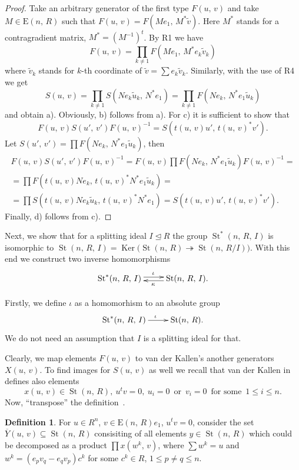 \documentclass[11pt]{amsart}
\theoremstyle{plain} \declaretheorem[name=Theorem, Refname={Theorem,Theorems}]{tm} \Crefname{tm}{Theorem}{Theorems}
\numberwithin{equation}{section}
\theoremstyle{definition} \newtheorem{df}[lm]{Definition} \Crefname{df}{Definition}{Definitions}
\theoremstyle{remark} \newtheorem{rk}[lm]{Remark} \Crefname{rk}{Remark}{Remarks}
\newcommand{\Ker}{\mathop{\mathrm{Ker}}\nolimits}
\newcommand{\E}{{\mathrm{E}}}
\newcommand{\St}{\mathop{\mathrm{St}}\nolimits}
\newcommand{\epi}{\twoheadrightarrow}
\newcommand{\inv}{^{-1}}
\begin{document}
\begin{proof}
Take an arbitrary generator of the first type $F(u,\,v)$ and take $M\in\E(n,\,R)$ such that $F(u,\,v)=F(Me_1,\,M^*\tilde v)$. Here $M^*$ stands for a contragradient matrix, $M^*=(M\inv)^t$. By R1 we have
$$
F(u,\,v)=\prod\limits_{k\neq1}F(Me_1,\,M^*e_k\tilde v_k)
$$
where $\tilde v_k$ stands for $k$-th coordinate of $\tilde v=\sum e_k\tilde v_k$. Similarly, with the use of R4 we get 
$$
S(u,\,v)=\prod\limits_{k\neq1}S(Ne_k\tilde u_k,\,N^*e_1)=\prod\limits_{k\neq1}F(Ne_k,\,N^*e_1\tilde u_k)
$$
and obtain a). Obviously, b) follows from a). For c) it is sufficient to show that
$$
F(u,\,v)S(u',\,v')F(u,\,v)\inv=S(t(u,\,v)u',\,t(u,\,v)^*v').
$$
Let $S(u',\,v')=\prod F(Ne_k,\,N^*e_1\tilde u_k)$, then
\begin{multline*}
F(u,\,v)S(u',\,v')F(u,\,v)\inv=F(u,\,v)\prod F(Ne_k,\,N^*e_1\tilde u_k)F(u,\,v)\inv=\\
=\prod F(t(u,\,v)Ne_k,\,t(u,\,v)^*N^*e_1\tilde u_k)=\\
=\prod S(t(u,\,v)Ne_k\tilde u_k,\,t(u,\,v)^*N^*e_1)=S(t(u,\,v)u',\,t(u,\,v)^*v').
\end{multline*}
Finally, d) follows from c).
\end{proof}

Next, we show that for a splitting ideal $I\trianglelefteq R$ the group $\St^*(n,\,R,\,I)$ is isomorphic to $\St(n,\,R,\,I)=\Ker\big(\St(n,\,R)\epi\St(n,\,R/I)\big)$. With this end we construct two inverse homomorphisms
$$
\xymatrix{
\St^*(n,\,R,\,I)\ar@<0.5ex>[r]^{\iota}&\St(n,\,R,\,I)\ar@<0.5ex>[l]^{\kappa}.
}
$$

Firstly, we define $\iota$ as a homomorhism to an absolute group
$$
\xymatrix{
\St^*(n,\,R,\,I)\ar@<0.0ex>[r]^{\iota}&\St(n,\,R).
}
$$
We do not need an assumption that $I$ is a splitting ideal for that.

Clearly, we map elements $F(u,\,v)$ to van der Kallen's another generators $X(u,\,v)$. To find images for $S(u,\,v)$ as well we recall that van der Kallen in~\cite[3.8--3.10]{vdK} defines also elements
$$
x(u,\,v)\in\St(n,\,R),\ u^tv=0,\ u_i=0\,\text{ or }\,v_i=0\,\text{ for some }\,1\leq i\leq n.
$$
Now, ``transpose'' the definition~\cite[3.13]{vdK}.

\begin{df}
For $u\in R^n$, $v\in\E(n,\,R)e_1$, $u^tv=0$, consider the set $\overline Y(u,\,v)\subseteq\St(n,\,R)$ consisiting of all elements $y\in\St(n,\,R)$ which could be decomposed as a product $\prod x(w^k,\,v)$, where $\sum w^k=u$ and $w^k=(e_pv_q-e_qv_p)c^k$ for some $c^k\in R$, $1\leq p\neq q\leq n$.
\end{df}
\end{document}
